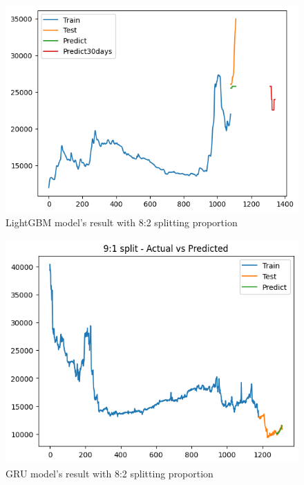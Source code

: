 \documentclass{ieeeojies}
\begin{document}
\vspace{-1em}

\begin{figure}[H]
  \centering
  \begin{minipage}{0.8\linewidth}
    \centering
    \includegraphics[width=\linewidth]{bibliography/Figure/LightGBM_DHT(8_2).png}
    \caption{LightGBM model's result with 8:2 splitting proportion}
    \label{fig8}
  \end{minipage}
\end{figure}

\vspace{-1em}

\begin{figure}[H]
  \centering
  \begin{minipage}{0.8\linewidth}
    \centering
    \includegraphics[width=\linewidth]{bibliography/Figure/DHT_GRU.png}
    \caption{GRU model's result with 8:2 splitting proportion}
    \label{fig8}
  \end{minipage}
\end{figure}
\end{document}
